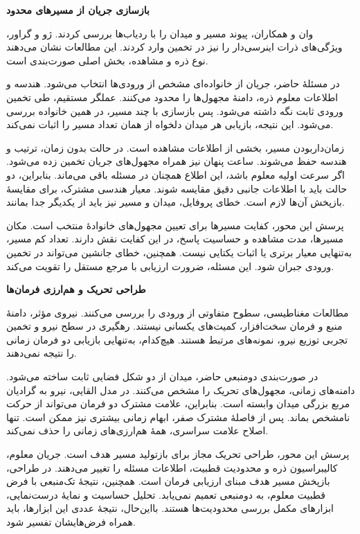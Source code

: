 \textbf{بازسازی جریان از مسیرهای محدود}

وان و همکاران، پیوند مسیر و میدان را با ردیاب‌ها بررسی کردند.
ژو و گراور، ویژگی‌های ذرات اینرسی‌دار را نیز در تخمین وارد کردند.
این مطالعات نشان می‌دهند نوع ذره و مشاهده، بخش اصلی صورت‌بندی است.
\cite{Wan2026TrajectoryFlowNet,ZhouGrauer2026Joint}

در مسئلهٔ حاضر، جریان از خانواده‌ای مشخص از ورودی‌ها انتخاب می‌شود.
هندسه و اطلاعات معلوم ذره، دامنهٔ مجهول‌ها را محدود می‌کنند.
عملگر مستقیم، طی تخمین ورودی ثابت نگه داشته می‌شود.
پس بازسازی با چند مسیر، در همین خانواده بررسی می‌شود.
این نتیجه، بازیابی هر میدان دلخواه از همان تعداد مسیر را اثبات نمی‌کند.

زمان‌داربودن مسیر، بخشی از اطلاعات مشاهده است.
در حالت بدون زمان، ترتیب و هندسه حفظ می‌شوند.
ساعت پنهان نیز همراه مجهول‌های جریان تخمین زده می‌شود.
اگر سرعت اولیه معلوم باشد، این اطلاع همچنان در مسئله باقی می‌ماند.
بنابراین، دو حالت باید با اطلاعات جانبی دقیق مقایسه شوند.
معیار هندسی مشترک، برای مقایسهٔ بازپخش آن‌ها لازم است.
خطای پروفایل، میدان و مسیر نیز باید از یکدیگر جدا بمانند.

پرسش این محور، کفایت مسیرها برای تعیین مجهول‌های خانوادهٔ منتخب است.
مکان مسیرها، مدت مشاهده و حساسیت پاسخ، در این کفایت نقش دارند.
تعداد کم مسیر، به‌تنهایی معیار برتری یا اثبات یکتایی نیست.
همچنین، خطای جانشین می‌تواند در تخمین ورودی جبران شود.
این مسئله، ضرورت ارزیابی با مرجع مستقل را تقویت می‌کند.
\cite{Cao2023ResidualCorrection}

\textbf{طراحی تحریک و هم‌ارزی فرمان‌ها}

مطالعات مغناطیسی، سطوح متفاوتی از ورودی را بررسی می‌کنند.
نیروی مؤثر، دامنهٔ منبع و فرمان سخت‌افزار، کمیت‌های یکسانی نیستند.
رهگیری در سطح نیرو و تخمین تجربی توزیع نیرو، نمونه‌های مرتبط هستند.
هیچ‌کدام، به‌تنهایی بازیابی دو فرمان زمانی را نتیجه نمی‌دهند.
\cite{ElHamdaoui2026Tracking,Strayer2024ForceMapping}

در صورت‌بندی دومنبعی حاضر، میدان از دو شکل فضایی ثابت ساخته می‌شود.
دامنه‌های زمانی، مجهول‌های تحریک را مشخص می‌کنند.
در مدل القایی، نیرو به گرادیان مربع بزرگی میدان وابسته است.
بنابراین، علامت مشترک دو فرمان می‌تواند از حرکت نامشخص بماند.
پس از فاصلهٔ مشترک صفر، ابهام زمانی بیشتری نیز ممکن است.
تنها اصلاح علامت سراسری، همهٔ هم‌ارزی‌های زمانی را حذف نمی‌کند.

پرسش این محور، طراحی تحریک مجاز برای بازتولید مسیر هدف است.
جریان معلوم، کالیبراسیون ذره و محدودیت قطبیت، اطلاعات مسئله را تغییر می‌دهند.
در طراحی، بازپخش مسیر هدف مبنای ارزیابی فرمان است.
همچنین، نتیجهٔ تک‌منبعی با فرض قطبیت معلوم، به دومنبعی تعمیم نمی‌یابد.
تحلیل حساسیت و نمایهٔ درست‌نمایی، ابزارهای مکمل بررسی محدودیت‌ها هستند.
بااین‌حال، نتیجهٔ عددی این ابزارها، باید همراه فرض‌هایشان تفسیر شود.
\cite{Raue2009ProfileLikelihood}

